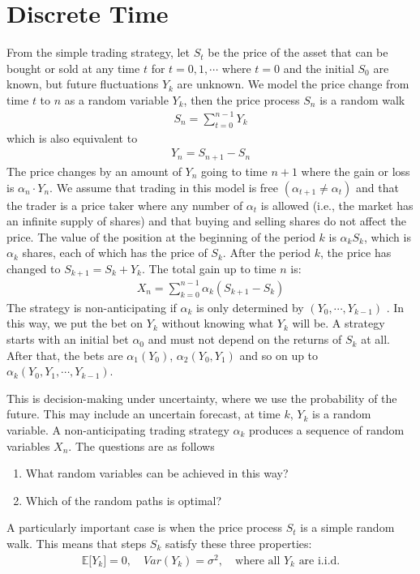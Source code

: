 \section{Discrete Time}
From the simple trading strategy, let $S_t$ be the price of the asset that can be bought or sold at any time $t$ for $t=0,1,\cdots$ where $t=0$ and the initial $S_0$ are known, but future fluctuations $Y_k$ are unknown. We model the price change from time $t$ to $n$ as a random variable $Y_k$, then the price process $S_n$ is a random walk
\begin{align*}
S_{n} = \sum_{t=0}^{n-1} Y_k
\end{align*}
which is also equivalent to
\begin{align*}
Y_{n} = S_{n+1} - S_n
\end{align*}
The price changes by an amount of $Y_n$ going to time $n+1$ where the gain or loss is $\alpha_n \cdot Y_n$. We assume that trading in this model is free $(\alpha_{t+1} \ne \alpha_t)$ and that the trader is a price taker where any number of $\alpha_t$ is allowed (i.e., the market has an infinite supply of shares) and that buying and selling shares do not affect the price. The value of the position at the beginning of the period $k$ is $\alpha_k S_k$, which is $\alpha_k$ shares, each of which has the price of $S_k$. After the period $k$, the price has changed to $S_{k+1} = S_k + Y_k$. The total gain up to time $n$ is:
\begin{align}\label{eq:discrete_ito_integral}
X_n = \sum_{k=0}^{n-1} \alpha_k (S_{k+1} - S_k)
\end{align}
The strategy is non-anticipating if $\alpha_k$ is only determined by $(Y_0, \cdots, Y_{k-1})$ .  In this way, we put the bet on $Y_k$ without knowing what $Y_k$ will be. A strategy starts with an initial bet $\alpha_0$ and must not depend on the returns of $S_k$ at all. After that, the bets are  $\alpha_1(Y_0)$, $\alpha_2(Y_0,Y_1)$ and so on up to $\alpha_k(Y_0,Y_1,\cdots,Y_{k-1})$.

This is decision-making under uncertainty, where we use the probability of the future. This may include an uncertain forecast, at time $k$, $Y_k$ is a random variable. A non-anticipating trading strategy $\alpha_k$ produces a sequence of random variables $X_n$. The questions are as follows
\begin{enumerate}
\item  What random variables can be achieved in this way?
\item Which of the random paths is optimal?
\end{enumerate}
A particularly important case is when the price process $S_t$ is a simple random walk. This means that steps $S_k$ satisfy these three properties:
\begin{align}\label{eq:rand_prop}
\mathbb{E[}Y_k] = 0, \quad Var(Y_k) = \sigma^2, \quad \text{where all $Y_k$ are i.i.d.}
\end{align}

